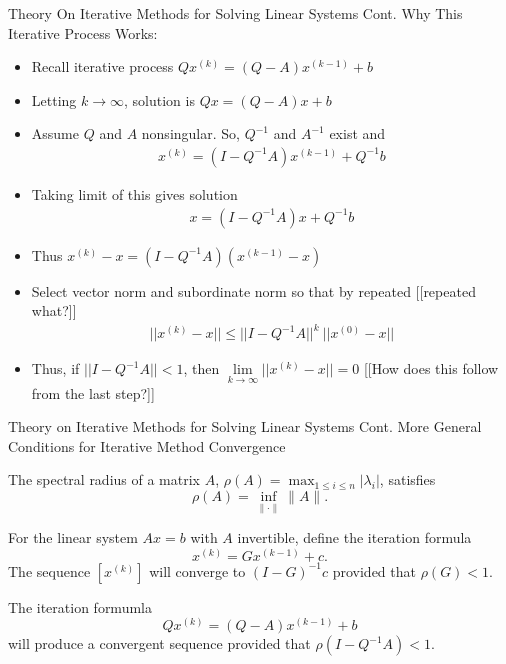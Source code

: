 \documentclass[9pt, serif]{beamer}
\newlength{\wideitemsep}
\let\olditem\item
\renewcommand{\item}{\setlength{\itemsep}{\wideitemsep}\olditem}
\newcommand{\bi}{\begin{itemize}}
\newcommand{\ei}{\end{itemize}}
\newcommand{\abs}[1]{\lvert#1\rvert}
\newcommand{\norm}[1]{\lVert#1\rVert}
\begin{document}
\begin{frame}{Theory On Iterative Methods for Solving Linear Systems Cont.}
    \pause
    Why This Iterative Process Works: \pause
    \bi
        \item Recall iterative process $Qx^{(k)} = (Q - A)x^{(k-1)} + b$ \pause
        \item Letting $k\rightarrow\infty$, solution is $Qx = (Q - A)x + b$ \pause
        \item Assume $Q$ and $A$ nonsingular. So, $Q^{-1}$ and $A^{-1}$ exist and
	    \begin{align*}
	        x^{(k)} = (I - Q^{-1}A)x^{(k-1)} + Q^{-1}b
	    \end{align*}
        \vspace{-3mm}
        \pause
        \item Taking limit of this gives solution
	    \begin{align*}
	        x = (I-Q^{-1}A)x+Q^{-1}b
	    \end{align*}
        \vspace{-3mm}
        \pause


        \item Thus $x^{(k)} - x = (I-Q^{-1}A)(x^{(k-1)}-x)$ \pause
        \item Select vector norm and subordinate norm so that by repeated [[repeated what?]]
	    \begin{align*}
	        ||x^{(k)} - x|| \leq || I -Q^{-1}A||^k~||x^{(0)}-x||
	    \end{align*}
        \vspace{-3mm}
        \pause
        \item Thus, if $|| I - Q^{-1}A|| < 1$, then $\lim\limits_{k\rightarrow\infty} ||x^{(k)} - x || = 0$ [[How does this follow from the last step?]]
    \ei
\end{frame}


\begin{frame}{Theory on Iterative Methods for Solving Linear Systems Cont.}
    More General Conditions for Iterative Method Convergence \pause
    \begin{theorem}
        The spectral radius of a matrix $A$, $\rho(A) = \max_{1\le i\le n}\abs{\lambda_i}$, satisfies $$\rho(A) = \inf_{\norm{\cdot}}\norm{A}.$$
    \end{theorem} 
    \pause
    \begin{theorem}
        For the linear system $Ax = b$ with $A$ invertible, define the iteration formula $$x^{(k)} = Gx^{(k-1)} + c.$$
        The sequence $\left[x^{(k)}\right]$ will converge to $(I - G)^{-1}c$ provided that $\rho(G) < 1$.
    \end{theorem}
    \pause
    \begin{corollary}
        The iteration formumla $$Qx^{(k)} = (Q-A)x^{(k-1)}+b$$ will produce a convergent sequence provided that $\rho(I-Q^{-1}A) < 1$.
    \end{corollary} 
\end{frame}
\end{document}
